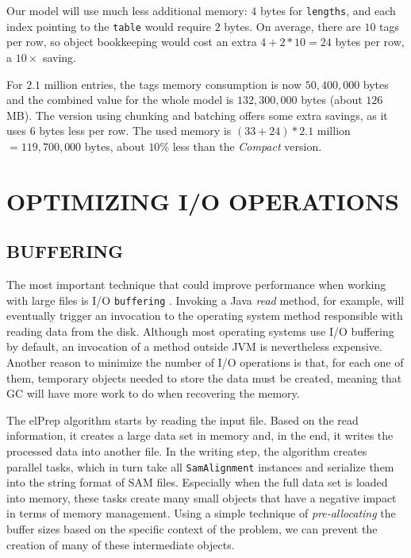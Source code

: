 \documentclass[a4paper,twoside]{article}
\begin{document}
{Our model will use much less additional memory: $4$ bytes for \texttt{lengths}, and each index pointing to the \texttt{table} would require $2$ bytes. On average, there are $10$ tags per row, so object bookkeeping would cost an extra $4 + 2*10 = 24$ bytes per row, a $10\times$ saving.

For $2.1$ million entries, the tags memory consumption is now $50,400,000$ bytes and the combined value for the whole model is $132,300,000$ bytes (about $126$ MB).
The version using chunking and batching offers some extra savings, as it uses $6$ bytes less per row.
The used memory is $(33 + 24) * 2.1$ million $= 119,700,000$ bytes, about $10\%$ less than the {\textit{Compact} } version.


\section{\uppercase{Optimizing I/O Operations}}
\label{sec:io}

\subsection{\uppercase{Buffering}}
\label{subsec:buffering}

The most important technique that could improve performance when working with large files is I/O {\texttt{buffering} } \cite{oaks:2014}.
Invoking a Java {\textit{read} } method, for example, will eventually trigger an invocation to the operating system method responsible with reading data from the disk.
Although most operating systems use I/O buffering by default, an invocation of a method outside JVM is nevertheless expensive. Another reason to minimize the number of I/O operations is that, for each one of them, temporary objects needed to store the data must be created, meaning that GC will have more work to do when recovering the memory. 


The elPrep algorithm starts by reading the input file. 
Based on the read information, it creates a large data set in memory and, in the end, it writes the processed data into another file.
In the writing step, the algorithm creates parallel tasks, which in turn take all \texttt{SamAlignment} instances and serialize them into the string format of SAM files.
Especially when the full data set is loaded into memory, these tasks create many small objects that have a negative impact in terms of memory management. Using a simple technique of {\textit{pre-allocating} } the buffer sizes based on the specific context of the problem, we can prevent the creation of many of these intermediate objects.

}
\end{document}
